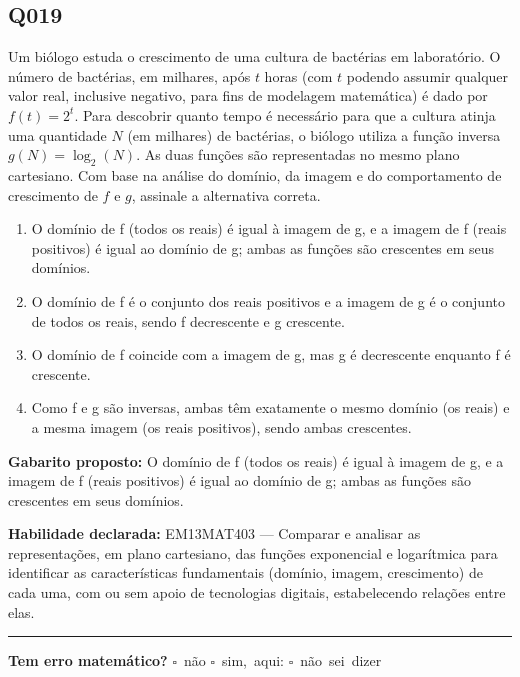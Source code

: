 \documentclass[11pt,a4paper]{article}
\begin{document}
\begin{samepage}
\subsection*{Q019}
Um biólogo estuda o crescimento de uma cultura de bactérias em laboratório. O número de bactérias, em milhares, após $t$ horas (com $t$ podendo assumir qualquer valor real, inclusive negativo, para fins de modelagem matemática) é dado por $f(t) = 2^t$. Para descobrir quanto tempo é necessário para que a cultura atinja uma quantidade $N$ (em milhares) de bactérias, o biólogo utiliza a função inversa $g(N) = \log_2(N)$. As duas funções são representadas no mesmo plano cartesiano. Com base na análise do domínio, da imagem e do comportamento de crescimento de $f$ e $g$, assinale a alternativa correta.
\begin{enumerate}[label=(\alph*),nosep,leftmargin=*]
\item O domínio de f (todos os reais) é igual à imagem de g, e a imagem de f (reais positivos) é igual ao domínio de g; ambas as funções são crescentes em seus domínios.
\item O domínio de f é o conjunto dos reais positivos e a imagem de g é o conjunto de todos os reais, sendo f decrescente e g crescente.
\item O domínio de f coincide com a imagem de g, mas g é decrescente enquanto f é crescente.
\item Como f e g são inversas, ambas têm exatamente o mesmo domínio (os reais) e a mesma imagem (os reais positivos), sendo ambas crescentes.
\end{enumerate}

\textbf{Gabarito proposto:} O domínio de f (todos os reais) é igual à imagem de g, e a imagem de f (reais positivos) é igual ao domínio de g; ambas as funções são crescentes em seus domínios.

\textbf{Habilidade declarada:} EM13MAT403 --- Comparar e analisar as representações, em plano cartesiano, das funções exponencial e logarítmica para identificar as características fundamentais (domínio, imagem, crescimento) de cada uma, com ou sem apoio de tecnologias digitais, estabelecendo relações entre elas.
\end{samepage}

\noindent\rule{\linewidth}{0.4pt}
\textbf{Tem erro matemático?}\quad
\mbox{$\square$~não} \quad \mbox{$\square$~sim, aqui:} \underline{\hspace{5cm}}
\quad \mbox{$\square$~não sei dizer}
\end{document}
